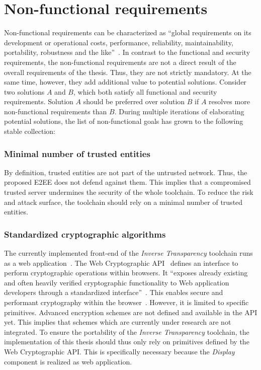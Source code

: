 \documentclass[../main.tex]{subfiles}
\begin{document}
\section{Non-functional requirements}\label{non-functional-requriements}
Non-functional requirements can be characterized as \enquote{global requirements on its development or operational costs, performance, reliability, maintainability, portability, robustness and the like}~\cite[11]{Mylopoulos1992}.
In contrast to the functional and security requirements, the non-functional requirements are not a direct result of the overall requirements of the thesis.
Thus, they are not strictly mandatory.
At the same time, however, they add additional value to potential solutions.
Consider two solutions $A$ and $B$, which both satisfy all functional and security requirements.
Solution $A$ should be preferred over solution $B$ if $A$ resolves more non-functional requirements than $B$.
During multiple iterations of elaborating potential solutions, the list of non-functional goals has grown to the following stable collection:

\subsubsection{Minimal number of trusted entities}
By definition, trusted entities are not part of the untrusted network. 
Thus, the proposed E2EE does not defend against them.
This implies that a compromised trusted server undermines the security of the whole toolchain.
To reduce the risk and attack surface, the toolchain should rely on a minimal number of trusted entities.

\subsubsection{Standardized cryptographic algorithms}
The currently implemented front-end of the \emph{Inverse Transparency} toolchain runs as a web application~\cite{Zieglmeier2021}. 
The Web Cryptographic API~\cite{WebCryptoApi2017} defines an interface to perform cryptographic operations within browsers. 
It \enquote{exposes already existing and often heavily verified cryptographic functionality to Web application developers through a standardized interface}~\cite[959]{Halpin2014}.
This enables secure and performant cryptography within the browser~\cite{Halpin2014}.
However, it is limited to specific primitives. 
Advanced encryption schemes are not defined and available in the API yet.
This implies that schemes which are currently under research are not integrated.
To ensure the portability of the \emph{Inverse Transparency} toolchain, the implementation of this thesis should thus only rely on primitives defined by the Web Cryptographic API.
This is specifically necessary because the \emph{Display} component is realized as web application.
\end{document}
